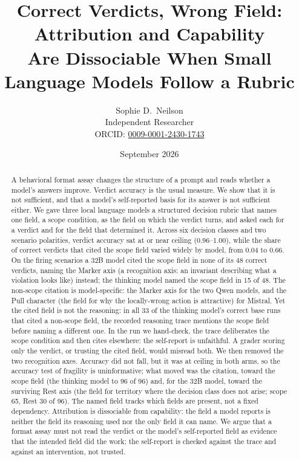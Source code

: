 \documentclass[11pt,a4paper]{article}
\title{%
  Correct Verdicts, Wrong Field: Attribution and Capability \\
  Are Dissociable When Small Language Models Follow a Rubric%
}
\author{Sophie D.\ Neilson \\
  \small Independent Researcher \\
  \small ORCID: \href{https://orcid.org/0009-0001-2430-1743}{0009-0001-2430-1743}
}
\date{September 2026}
\begin{document}
\maketitle

\begin{abstract}
A behavioral format assay changes the structure of a prompt and reads whether a
model's answers improve. Verdict accuracy is the usual measure. We show that it
is not sufficient, and that a model's self-reported basis for its answer is not
sufficient either. We gave three local language models a structured decision
rubric that names one field, a scope condition, as the field on which the verdict
turns, and asked each for a verdict and for the field that determined it. Across
six decision classes and two scenario polarities, verdict accuracy sat at or near
ceiling (0.96--1.00), while the share of correct verdicts that cited the scope
field varied widely by model, from 0.04 to 0.66. On the firing scenarios a 32B
model cited the scope field in none of its 48 correct verdicts, naming the Marker
axis (a recognition axis: an invariant describing what a violation looks like)
instead; the thinking model named the scope field in 15 of 48. The non-scope
citation is model-specific: the Marker axis for the two Qwen models, and the Pull
character (the field for why the locally-wrong action is attractive) for Mistral.
Yet the cited field is not the reasoning:
in all 33 of the thinking model's correct base runs that cited a non-scope field,
the recorded reasoning trace mentions the scope field before naming a different
one. In the run we hand-check, the trace deliberates the scope condition and then
cites elsewhere: the self-report is unfaithful. A grader scoring only the verdict, or
trusting the cited field, would misread both. We then removed the two recognition
axes. Accuracy did not fall, but it was at ceiling in both arms, so the accuracy
test of fragility is uninformative; what moved was the citation, toward the scope
field (the thinking model to 96 of 96) and, for the 32B model, toward the
surviving Rest axis (the field for territory where the decision class does not
arise; scope 65, Rest 30 of 96). The named field tracks which
fields are present, not a fixed dependency. Attribution is dissociable from
capability: the field a model reports is neither the field its reasoning used nor
the only field it can name. We argue that a format assay must not read the verdict
or the model's self-reported field as evidence that the intended field did the
work; the self-report is checked against the trace and against an intervention,
not trusted.
\end{abstract}
\end{document}
